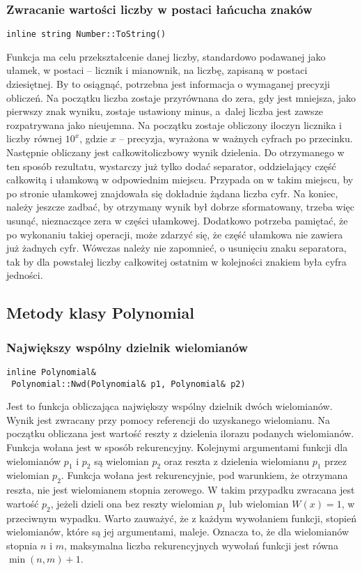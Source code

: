 \subsubsection{Zwracanie wartości liczby w postaci łańcucha znaków}
\begin{lstlisting}
inline string Number::ToString()
\end{lstlisting}

Funkcja ma celu przekształcenie danej liczby, standardowo podawanej jako ułamek, w postaci -- licznik i mianownik, na liczbę, zapisaną w postaci dziesiętnej. By to osiągnąć, potrzebna jest informacja o wymaganej precyzji obliczeń. Na początku liczba zostaje przyrównana do zera, gdy jest mniejsza, jako pierwszy znak wyniku, zostaje ustawiony minus, a~dalej liczba jest zawsze rozpatrywana jako nieujemna. Na początku zostaje obliczony iloczyn licznika i liczby równej $10^x$, gdzie $x$ -- precyzja, wyrażona w ważnych cyfrach po przecinku. Następnie obliczany jest całkowitoliczbowy wynik dzielenia. Do otrzymanego w ten sposób rezultatu, wystarczy już tylko dodać separator, oddzielający część całkowitą i ułamkową w odpowiednim miejscu. Przypada on w takim miejscu, by po stronie ułamkowej znajdowała się dokładnie żądana liczba cyfr. Na koniec, należy jeszcze zadbać, by otrzymany wynik był dobrze sformatowany, trzeba więc usunąć, nieznaczące zera w części ułamkowej. Dodatkowo potrzeba pamiętać, że po wykonaniu takiej operacji, może zdarzyć się, że część ułamkowa nie zawiera już żadnych cyfr. Wówczas należy nie zapomnieć, o usunięciu znaku separatora, tak by dla powstałej liczby całkowitej ostatnim w kolejności znakiem była cyfra jedności.

\subsection{Metody klasy Polynomial}

\subsubsection{Największy wspólny dzielnik wielomianów}
\begin{lstlisting}
inline Polynomial&
 Polynomial::Nwd(Polynomial& p1, Polynomial& p2)
\end{lstlisting}

Jest to funkcja obliczająca największy wspólny dzielnik dwóch wielomianów. Wynik jest zwracany przy pomocy referencji do uzyskanego wielomianu. Na początku obliczana jest wartość reszty z dzielenia ilorazu podanych wielomianów. Funkcja wołana jest w sposób rekurencyjny. Kolejnymi argumentami funkcji dla wielomianów $p_1$ i $p_2$ są wielomian $p_2$ oraz reszta z dzielenia wielomianu $p_1$ przez wielomian $p_2$. Funkcja wołana jest rekurencyjnie, pod warunkiem, że otrzymana reszta, nie jest wielomianem stopnia zerowego. W takim przypadku zwracana jest wartość $p_2$, jeżeli dzieli ona bez reszty wielomian $p_1$ lub wielomian $W(x)=1$, w przeciwnym wypadku. Warto zauważyć, że z każdym wywołaniem funkcji, stopień wielomianów, które są jej argumentami, maleje. Oznacza to, że dla wielomianów stopnia $n$ i $m$, maksymalna liczba rekurencyjnych wywołań funkcji jest równa $\min(n,m)+1$.

